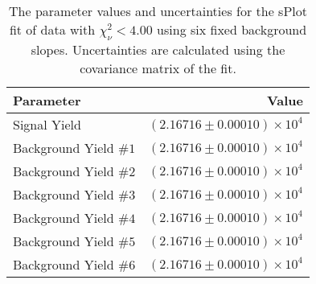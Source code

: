 
\begin{table}[h]
    \begin{center}
        \begin{tabular}{lr}\toprule
            Parameter & Value \\\midrule
            Signal Yield & $(2.16716 \pm 0.00010) \times 10^{4}$ \\
            Background Yield $\#1$ & $(2.16716 \pm 0.00010) \times 10^{4}$ \\
            Background Yield $\#2$ & $(2.16716 \pm 0.00010) \times 10^{4}$ \\
            Background Yield $\#3$ & $(2.16716 \pm 0.00010) \times 10^{4}$ \\
            Background Yield $\#4$ & $(2.16716 \pm 0.00010) \times 10^{4}$ \\
            Background Yield $\#5$ & $(2.16716 \pm 0.00010) \times 10^{4}$ \\
            Background Yield $\#6$ & $(2.16716 \pm 0.00010) \times 10^{4}$ \\\bottomrule
        \end{tabular}
        \caption{The parameter values and uncertainties for the sPlot fit of data with $\chi^2_\nu < 4.00$ using six fixed background slopes. Uncertainties are calculated using the covariance matrix of the fit.}
    \end{center}
\end{table}
